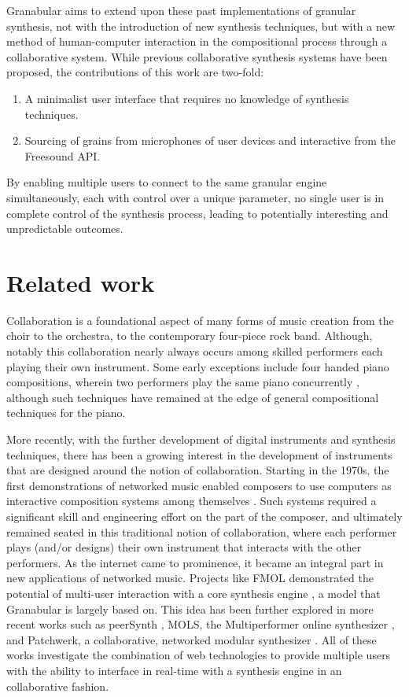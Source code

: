 \documentclass{nime-alternate}
\begin{document}
Granabular aims to extend upon these past implementations of granular synthesis, not with the introduction of new synthesis techniques, 
but with a new method of human-computer interaction in the compositional process through a collaborative system. 
While previous collaborative synthesis systems have been proposed, the contributions of this work are two-fold:

\begin{enumerate}
	\item A minimalist user interface that requires no knowledge of synthesis techniques.
	\item Sourcing of grains from microphones of user devices and interactive from the Freesound API. 
\end{enumerate}

By enabling multiple users to connect to the same granular engine simultaneously, 
each with control over a unique parameter, no single user is in complete control of the synthesis process, 
leading to potentially interesting and unpredictable outcomes. 

\section{Related work}

Collaboration is a foundational aspect of many forms of music creation from the choir to the orchestra, 
to the contemporary four-piece rock band. 
Although, notably this collaboration nearly always occurs among skilled performers each playing their own instrument. 
Some early exceptions include four handed piano compositions, 
wherein two performers play the same piano concurrently \cite{kuhn2001music}, 
although such techniques have remained at the edge of general compositional techniques for the piano. 

More recently, with the further development of digital instruments and synthesis techniques, 
there has been a growing interest in the development of instruments that are designed around the notion of collaboration. 
Starting in the 1970s, the first demonstrations of networked music enabled composers to use computers as interactive composition systems among themselves \cite{bischoff1978network}. 
Such systems required a significant skill and engineering effort on the part of the composer, 
and ultimately remained seated in this traditional notion of collaboration, 
where each performer plays (and/or designs) their own instrument that interacts with the other performers. 
As the internet came to prominence, it became an integral part in new applications of networked music. 
Projects like FMOL demonstrated the potential of multi-user interaction with a core synthesis engine \cite{jorda2001fmol}, 
a model that Granabular is largely based on. 
This idea has been further explored in more recent works such as peerSynth \cite{stelkens2003peersynth}, 
MOLS, the Multiperformer online synthesizer \cite{herrera2009mols}, 
and Patchwerk, a collaborative, networked modular synthesizer \cite{mayton2012patchwerk}. 
All of these works investigate the combination of web technologies to provide multiple users
with the ability to interface in real-time with a synthesis engine in an collaborative fashion.
\end{document}
